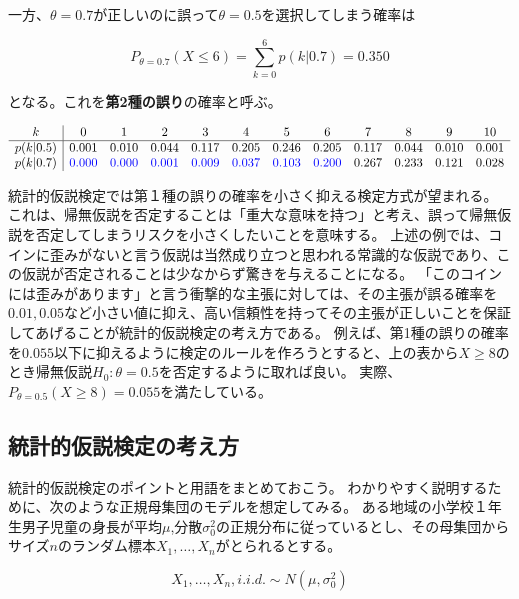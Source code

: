 \documentclass{article}
\begin{document}
一方、$\theta=0.7$が正しいのに誤って$\theta=0.5$を選択してしまう確率は

$$
P_{\theta = 0.7}(X \leq 6) = \sum_{k=0}^{6} p(k|0.7)=0.350
$$

となる。これを\textbf{第2種の誤り}の確率と呼ぶ。

\begin{table}[h]
  \centering
  \[
  \begin{array}{c|ccccccccccc}
  k & 0 & 1 & 2 & 3 & 4 & 5 & 6 & 7 & 8 & 9 & 10 \\ \hline
  p(k|0.5) & 0.001 & 0.010 & 0.044 & 0.117 & 0.205 & 0.246 & 0.205 & 0.117 & 0.044 & 0.010 & 0.001 \\
  p(k|0.7) & \textcolor{blue}{0.000} & \textcolor{blue}{0.000} & \textcolor{blue}{0.001} & \textcolor{blue}{0.009} & \textcolor{blue}{0.037} & \textcolor{blue}{0.103} & \textcolor{blue}{0.200} & 0.267 & 0.233 & 0.121 & 0.028 \\
  \end{array}
  \]
\end{table}

統計的仮説検定では第１種の誤りの確率を小さく抑える検定方式が望まれる。
これは、帰無仮説を否定することは「重大な意味を持つ」と考え、誤って帰無仮説を否定してしまうリスクを小さくしたいことを意味する。
上述の例では、コインに歪みがないと言う仮説は当然成り立つと思われる常識的な仮説であり、この仮説が否定されることは少なからず驚きを与えることになる。
「このコインには歪みがあります」と言う衝撃的な主張に対しては、その主張が誤る確率を$0.01,0.05$など小さい値に抑え、高い信頼性を持ってその主張が正しいことを保証してあげることが統計的仮説検定の考え方である。
例えば、第1種の誤りの確率を$0.055$以下に抑えるように検定のルールを作ろうとすると、上の表から$X \geq 8$のとき帰無仮説$H_0:\theta=0.5$を否定するように取れば良い。
実際、$P_{\theta=0.5}(X \geq 8)=0.055$を満たしている。

\subsection{統計的仮説検定の考え方}

統計的仮説検定のポイントと用語をまとめておこう。
わかりやすく説明するために、次のような正規母集団のモデルを想定してみる。
ある地域の小学校１年生男子児童の身長が平均$\mu$,分散$\sigma_0^2$の正規分布に従っているとし、その母集団からサイズ$n$のランダム標本$X_1, \ldots,X_n$がとられるとする。

\begin{equation}	\label{eq:seiki}
  X_1, \ldots, X_n, i.i.d. \sim N(\mu, \sigma_0^2)
\end{equation}
\end{document}
